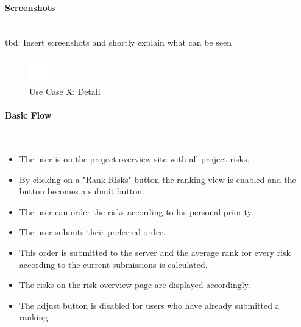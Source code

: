 \paragraph*{Screenshots}\mbox{}\\
tbd: Insert screenshots and shortly explain what can be seen

\begin{figure}[h] 
	\centering
	\includegraphics[width=0.1\textwidth]{Content/Domain/placeholder.png}
	\caption{Use Case X: Detail}
	\label{fig:label4}
\end{figure}

\paragraph*{Basic Flow} \mbox{}\\
\begin{itemize}
	\vspace{-3mm}
	\setlength\itemsep{-1em}
	\item The user is on the project overview site with all project risks.
	\item By clicking on a "Rank Risks" button the ranking view is enabled and the button becomes a submit button.
	\item The user can order the risks according to his personal priority.
	\item The user submits their preferred order.
	\item This order is submitted to the server and the average rank for every risk according to the current submissions is calculated.
	\item The risks on the risk overview page are displayed accordingly.
	\item The adjust button is disabled for users who have already submitted a ranking.
\end{itemize}

